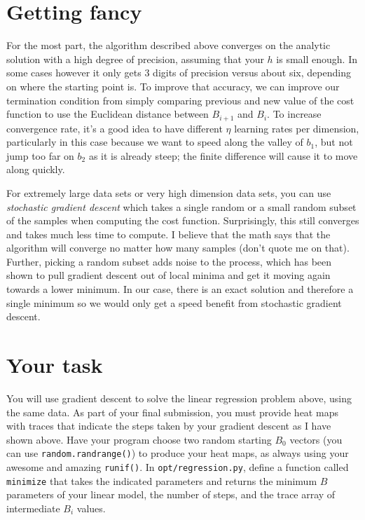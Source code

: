 \begin{fullwidth}
\section{Getting fancy}

For the most part, the algorithm described above converges on the analytic solution with a high degree of precision, assuming that your $h$ is small enough. In some cases however it only gets 3 digits of precision versus about six, depending on where the starting point is. To improve that accuracy, we can improve our termination condition from simply comparing previous and new value of the cost function to use the Euclidean distance between $B_{i+1}$ and $B_i$. To increase convergence rate, it's a good idea to have different $\eta$ learning rates per dimension, particularly in this case because we want to speed along the valley of $b_1$, but not jump too far on $b_2$ as it is already steep; the finite difference will cause it to move along quickly.

For extremely large data sets or very high dimension data sets, you can use {\em stochastic gradient descent} which takes a single random or a small random subset of the samples when computing the cost function. Surprisingly, this still converges and takes much less time to compute. I believe that the math says that the algorithm will converge no matter how many samples (don't quote me on that). Further, picking a random subset adds noise to the process, which has been shown to pull gradient descent out of local minima and get it moving again towards a lower minimum. In our case, there is an exact solution and therefore a single minimum so we would only get a speed benefit from stochastic gradient descent.

\section{Your task}

You will use gradient descent to solve the linear regression problem above, using the same data. As part of your final submission, you must provide heat maps with traces that indicate the steps taken by your gradient descent as I have shown above.  Have your program choose two random starting $B_0$ vectors (you can use {\tt random.randrange()}) to produce your heat maps, as always using your awesome and amazing {\tt runif()}.   In {\tt opt/regression.py}, define a function called {\tt minimize} that takes the indicated parameters and returns the minimum $B$ parameters of your linear model, the number of steps, and the trace array of intermediate $B_i$ values.


\end{fullwidth}
